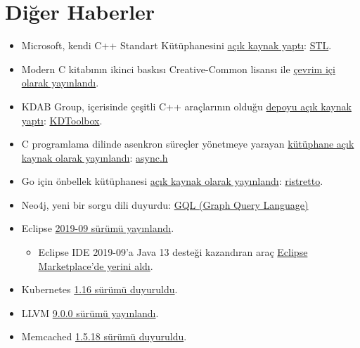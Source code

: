 \documentclass[11pt]{article}
\begin{document}
\section{Diğer Haberler}
\label{sec:org6d2fc21}
\begin{itemize}
\item Microsoft, kendi C++ Standart Kütüphanesini \href{https://devblogs.microsoft.com/cppblog/open-sourcing-msvcs-stl/}{açık kaynak yaptı}: \href{https://github.com/microsoft/STL}{STL}.
\item Modern C kitabının ikinci baskısı Creative-Common lisansı ile \href{https://gustedt.wordpress.com/2019/09/18/modern-c-second-edition/}{çevrim içi
olarak yayınlandı}.
\item KDAB Group, içerisinde çeşitli C++ araçlarının olduğu \href{https://www.kdab.com/introducing-kdtoolbox/}{depoyu açık kaynak
yaptı}: \href{https://github.com/KDAB/KDToolBox}{KDToolbox}.
\item C programlama dilinde asenkron süreçler yönetmeye yarayan \href{https://higherlogics.blogspot.com/2019/09/asynch-asynchronous-stackless.html}{kütüphane açık
kaynak olarak yayınlandı}: \href{https://github.com/naasking/async.h}{async.h}
\item Go için önbellek kütüphanesi \href{https://blog.dgraph.io/post/introducing-ristretto-high-perf-go-cache/}{açık kaynak olarak yayınlandı}: \href{https://github.com/dgraph-io/ristretto}{ristretto}.
\item Neo4j, yeni bir sorgu dili duyurdu: \href{https://neo4j.com/press-releases/query-language-graph-databases-international-standard/}{GQL (Graph Query Language)}
\item Eclipse \href{https://www.eclipse.org/eclipseide/2019-09/noteworthy/}{2019-09 sürümü yayınlandı}.
\begin{itemize}
\item Eclipse IDE 2019-09'a Java 13 desteği kazandıran araç \href{https://marketplace.eclipse.org/content/java-13-support-eclipse-2019-09-413}{Eclipse
Marketplace'de yerini aldı}.
\end{itemize}
\item Kubernetes \href{https://kubernetes.io/blog/2019/09/18/kubernetes-1-16-release-announcement/}{1.16 sürümü duyuruldu}.
\item LLVM \href{http://lists.llvm.org/pipermail/llvm-dev/2019-September/135304.html}{9.0.0 sürümü yayınlandı}.
\item Memcached \href{https://github.com/memcached/memcached/wiki/ReleaseNotes1518}{1.5.18 sürümü duyuruldu}.

\end{itemize}
\end{document}
